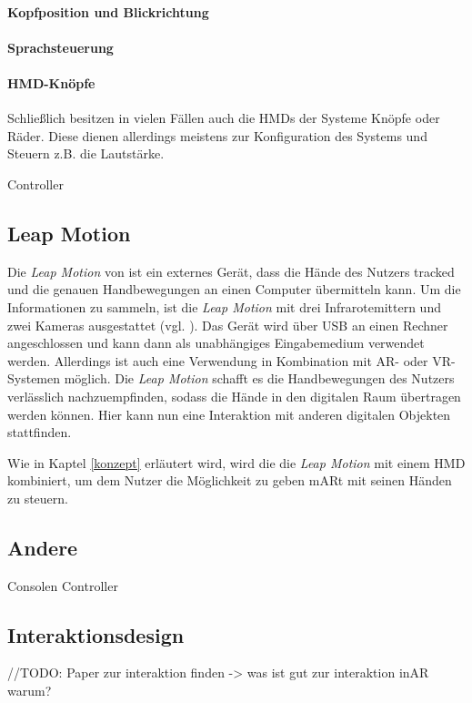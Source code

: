 \paragraph{Kopfposition und Blickrichtung}

\paragraph{Sprachsteuerung}
\paragraph{HMD-Knöpfe}
Schließlich besitzen in vielen Fällen auch die HMDs der Systeme Knöpfe oder Räder. Diese dienen allerdings meistens zur Konfiguration des Systems und Steuern z.B. die Lautstärke.

Controller
\subsection{Leap Motion}

Die \textit{Leap Motion} von \citet{leapMotion} ist ein externes Gerät, dass die Hände des Nutzers tracked und die genauen Handbewegungen an einen Computer übermitteln kann. 
Um die Informationen zu sammeln, ist die \textit{Leap Motion} mit drei Infrarotemittern und zwei Kameras ausgestattet (vgl. \citet{Weichert13}). Das Gerät wird über USB an einen Rechner angeschlossen und kann dann als unabhängiges Eingabemedium verwendet werden. Allerdings ist auch eine Verwendung in Kombination mit AR- oder VR-Systemen möglich. 
Die \textit{Leap Motion} schafft es die Handbewegungen des Nutzers verlässlich nachzuempfinden, sodass die Hände in den digitalen Raum übertragen werden können. Hier kann nun eine Interaktion mit anderen digitalen Objekten stattfinden. 

Wie in Kaptel \ref{konzept} erläutert wird, wird die die \textit{Leap Motion} mit einem HMD kombiniert, um dem Nutzer die Möglichkeit zu geben mARt mit seinen Händen zu steuern.

\subsection{Andere}
Consolen Controller
\subsection{Interaktionsdesign}

//TODO:
Paper zur interaktion finden
-> was ist gut zur interaktion inAR warum?

